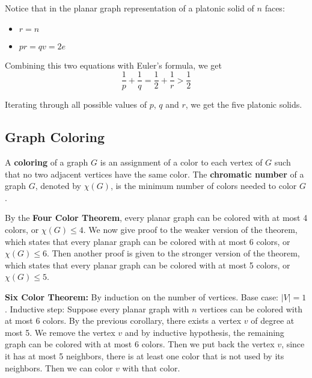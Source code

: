 \documentclass[a4paper,12pt]{article}
\begin{document}
Notice that in the planar graph representation of a platonic solid of $n$ faces:
\begin{itemize}
	\item $r = n$
	\item $pr = qv = 2e$
\end{itemize}

Combining this two equations with Euler's formula, we get
\begin{equation*}
	\frac{1}{p} + \frac{1}{q} = \frac{1}{2} + \frac{1}{r} > \frac{1}{2}
\end{equation*}

Iterating through all possible values of $p$, $q$ and $r$, we get the five platonic solids.

\subsection{Graph Coloring}

A \textbf{coloring} of a graph $G$ is an assignment of a color to each vertex of $G$ such that no two adjacent vertices have the same color.
The \textbf{chromatic number} of a graph $G$, denoted by $\chi(G)$, is the minimum number of colors needed to color $G$.

By the \textbf{Four Color Theorem}, every planar graph can be colored with at most 4 colors, or $\chi(G) \leq 4$.
We now give proof to the weaker version of the theorem, which states that every planar graph can be colored with at most 6 colors, or $\chi(G) \leq 6$.
Then another proof is given to the stronger version of the theorem, which states that every planar graph can be colored with at most 5 colors, or $\chi(G) \leq 5$.

\textbf{Six Color Theorem:}
By induction on the number of vertices.
Base case: $|V| = 1$.
Inductive step: Suppose every planar graph with $n$ vertices can be colored with at most 6 colors.
By the previous corollary, there exists a vertex $v$ of degree at most 5.
We remove the vertex $v$ and by inductive hypothesis, the remaining graph can be colored with at most 6 colors.
Then we put back the vertex $v$, since it has at most 5 neighbors, there is at least one color that is not used by its neighbors.
Then we can color $v$ with that color.
\end{document}
